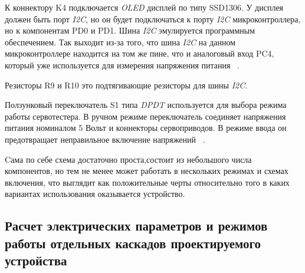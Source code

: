 К коннектору K4 подключается \textit{OLED} дисплей по типу SSD1306.  У
дисплея должен быть порт \textit{I2C}, но он будет подключаться к
порту \textit{I2C} микроконтроллера, но к компонентам PD0 и PD1. Шина
\textit{I2C} эмулируется программным обеспечением. Так выходит из-за
того, что шина \textit{I2C} на данном микроконтроллере находится на
том же пине, что и аналоговый вход PC4, который уже используется для
измерения напряжения питания ~\cite{Elector521}.

Резисторы R9 и R10 это подтягивающие резисторы для шины \textit{I2C}.

Ползунковый переключатель S1 типа \textit{DPDT} используется для
выбора режима работы сервотестера. В ручном режиме переключатель
соединяет напряжения питания номиналом 5 Вольт и коннекторы
сервоприводов. В режиме ввода он предотвращает неправильное включение
напряжений ~\cite{Elector521}.

Cама по себе схема достаточно проста,состоит из небольшого числа
компонентов, но тем не менее может работать в нескольких режимах и
схемах включения, что выглядит как положительные черты относительно
того в каких вариантах использования оказывается устройство.

\subsection{Расчет электрических параметров 
  и режимов работы 
  отдельных каскадов проектируемого устройства}


\newpage
